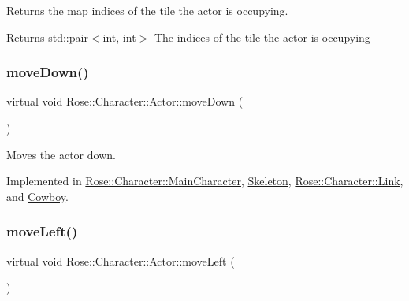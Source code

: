 Returns the map indices of the tile the actor is occupying. 

\begin{DoxyReturn}{Returns}
std\+::pair$<$int, int$>$ The indices of the tile the actor is occupying 
\end{DoxyReturn}
\mbox{\label{classRose_1_1Character_1_1Actor_a3ccb744404ed29c77fe9420f274a6826}} 
\subsubsection{\texorpdfstring{moveDown()}{moveDown()}}
{\footnotesize\ttfamily virtual void Rose\+::\+Character\+::\+Actor\+::move\+Down (\begin{DoxyParamCaption}{ }\end{DoxyParamCaption})\hspace{0.3cm}{\ttfamily [pure virtual]}}



Moves the actor down. 



Implemented in \mbox{\hyperlink{classRose_1_1Character_1_1MainCharacter_ac6a35f90921775e254bbb723998e84cd}{Rose\+::\+Character\+::\+Main\+Character}}, \mbox{\hyperlink{classSkeleton_aee2055fa3d1db80392b365aa40c878bf}{Skeleton}}, \mbox{\hyperlink{classRose_1_1Character_1_1Link_a3e1834381624bf9012ea3921695d9007}{Rose\+::\+Character\+::\+Link}}, and \mbox{\hyperlink{classCowboy_a25b9c66203a4a5e762984ca0bed511e0}{Cowboy}}.

\mbox{\label{classRose_1_1Character_1_1Actor_a45191259db61cf46cb3d99bf186b48d3}} 
\subsubsection{\texorpdfstring{moveLeft()}{moveLeft()}}
{\footnotesize\ttfamily virtual void Rose\+::\+Character\+::\+Actor\+::move\+Left (\begin{DoxyParamCaption}{ }\end{DoxyParamCaption})\hspace{0.3cm}{\ttfamily [pure virtual]}}



